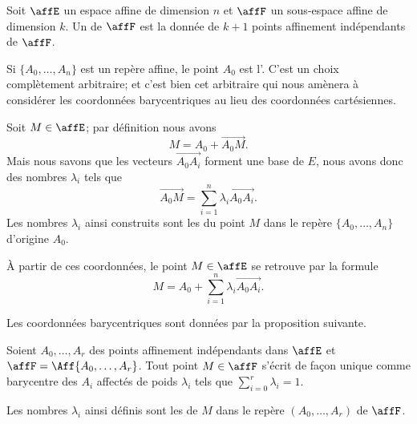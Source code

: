 \begin{definition}  \label{DefguuwEO}
    Soit \( \affE\) un espace affine de dimension \( n\) et \( \affF\) un sous-espace affine de dimension \( k\). Un  de \( \affF\) est la donnée de \( k+1\) points affinement indépendants de \( \affF\).
\end{definition}
Si \( \{ A_0,\ldots, A_n \}\) est un repère affine, le point \( A_0\) est l'. C'est un choix complètement arbitraire; et c'est bien cet arbitraire qui nous amènera à considérer les coordonnées barycentriques au lieu des coordonnées cartésiennes.

Soit \( M\in \affE\); par définition nous avons
\begin{equation}
    M=A_0+\overrightarrow{ A_0M }.
\end{equation}
Mais nous savons que les vecteurs \( \overrightarrow{ A_0A_i }\) forment une base de \( E\), nous avons donc des nombres \( \lambda_i\) tels que
\begin{equation}
    \overrightarrow{ A_0M }=\sum_{i=1}^n\lambda_i\overrightarrow{ A_0A_i }.
\end{equation}
Les nombres \( \lambda_i\) ainsi construits sont les  du point \( M\) dans le repère \( \{ A_0,\ldots, A_n \}\) d'origine \( A_0\).

À partir de ces coordonnées, le point \( M\in\affE\) se retrouve par la formule
\begin{equation}
    M=A_0+\sum_{i=1}^n\lambda_i\overrightarrow{ A_0A_i }.
\end{equation}

Les coordonnées barycentriques sont données par la proposition suivante.
\begin{proposition}      \label{PROPooTIRXooLAipRa}
    Soient \( A_0,\ldots, A_r\) des points affinement indépendants dans \( \affE\) et \( \affF=\Aff\{ A_0,\ldots, A_r \}\). Tout point \( M\in\affF\) s'écrit de façon unique comme barycentre des \( A_i\) affectés de poids \( \lambda_i\) tels que \( \sum_{i=0}^r\lambda_i=1\).
\end{proposition}
Les nombres \( \lambda_i\) ainsi définis sont les  de \( M\) dans le repère \( (A_0,\ldots, A_r)\) de \( \affF\).

